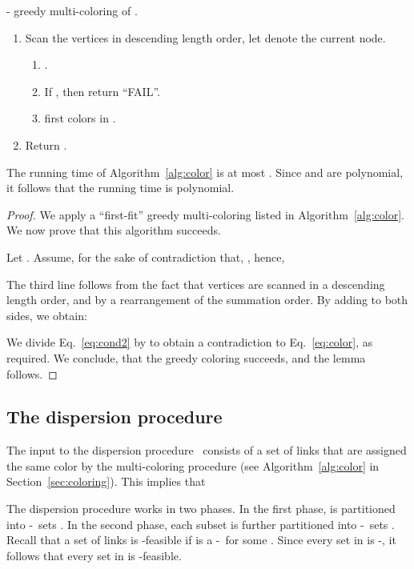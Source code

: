 \documentclass[11pt]{article}
\newenvironment{proof sketch}{\noindent {\bf Proof sketch:} }{\hfill \qed}
\newcommand{\sinr}{\text{\sc{sinr}}}
\newcommand{\disperse}{\text{\emph{disperse}}}
\newcommand{\barsignal}{}
\begin{document}
\begin{algorithm}
\caption{ - greedy multi-coloring of . }
\label{alg:color}
  \begin{enumerate}
  \item Scan the vertices in descending  length order, let  denote the current node.
    \begin{enumerate}
    \item .
    \item If , then return
      ``FAIL''.
    \item  first  colors
      in .
    \end{enumerate}
  \item Return .
  \end{enumerate}
\end{algorithm}

The running time of Algorithm~\ref{alg:color} is at most .
Since  and  are polynomial, it follows that the running time is polynomial.

\begin{proof}
  We apply a ``first-fit'' greedy multi-coloring listed in
  Algorithm~\ref{alg:color}.  We now prove that this algorithm
  succeeds.

  Let .  Assume, for the sake
  of contradiction that, , hence,
    
    The third line follows from the fact that vertices are scanned in
    a descending length order, and by a
    rearrangement of the summation order.
 By adding  to both sides, we obtain:
    
    We divide Eq.~\ref{eq:cond2} by  to obtain a contradiction to Eq.~\ref{eq:color}, as required.
We conclude, that the greedy coloring succeeds, and the lemma follows.
\end{proof}

\subsection{The dispersion procedure \disperse}\label{sec:disperese}
The input to the dispersion procedure \disperse\ consists of a set  of links that are assigned the same color by the multi-coloring
procedure (see Algorithm~\ref{alg:color} in Section~\ref{sec:coloring}).
This implies that


The dispersion procedure works in two phases.  In the first phase, 
is partitioned into -\barsignal\ sets . In the
second phase, each subset  is further partitioned into -\barsignal\ sets .
Recall that a set of links  is \sinr-feasible if  is a -\barsignal\ for some .
Since every set in   is -\barsignal, it follows that every set in  is \sinr-feasible.
\end{document}
